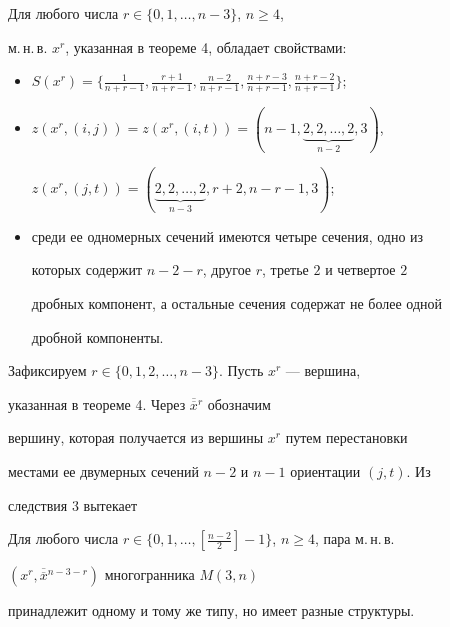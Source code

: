 \begin{cor}


Для любого числа $r\in \{0,1,\dotsc,n-3\}$, $n\geq 4$,


м.\,н.\,в. $x^r$, указанная в теореме 4, обладает свойствами:


\begin{itemize}


\item[1)] $S(x^r)=\{\frac{1}{n+r-1},\frac{r+1}{n+r-1},


\frac{n-2}{n+r-1},\frac{n+r-3}{n+r-1},\frac{n+r-2}{n+r-1} \}$;


\item[2)] $z(x^r,(i,j))=z(x^r,(i,t))=(n-1,\underbrace{2,2,\dotsc,2}_{n-2},3)$,


$z(x^r,(j,t))=(\underbrace{2,2,\dotsc,2}_{n-3},r+2,n-r-1,3)$;


\item[3)] среди ее одномерных сечений имеются четыре сечения, одно из


которых содержит $n-2-r$, другое $r$, третье $2$ и четвертое $2$


дробных компонент, а остальные сечения содержат не более одной


дробной компоненты.


\end{itemize}


\end{cor}





Зафиксируем $r\in \{0,1,2,\dotsc,n-3\}$. Пусть $x^r$ --- вершина,


указанная в теореме 4. Через $\overline{\overline{x}}{}^r$ обозначим


вершину, которая получается из вершины $x^r$ путем перестановки


местами ее двумерных сечений $n-2$ и $n-1$ ориентации $(j,t)$. Из


следствия 3 вытекает





\begin{cor}


Для любого числа $r\in


\{0,1,\dotsc,\left[\frac{n-2}{2}\right]-1\}$, $n\geq 4$, пара м.\,н.\,в.


$(x^r,\overline{\overline{x}}{}^{n-3-r})$ многогранника $M(3,n)$


принадлежит одному и тому же типу, но имеет разные структуры.


\end{cor}





